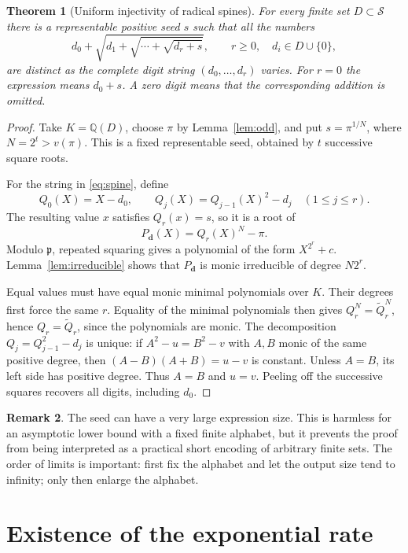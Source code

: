 \documentclass[11pt,letterpaper]{article}
\numberwithin{equation}{section}
\newtheorem{theorem}{Theorem}[section]
\theoremstyle{definition}
\newtheorem{remark}[theorem]{Remark}
\newcommand{\Sset}{\mathcal S}
\newcommand{\Q}{\mathbb Q}
\begin{document}
\begin{theorem}[Uniform injectivity of radical spines]\label{thm:spines}
For every finite set $D\subset\Sset$ there is a representable positive seed
$s$ such that all the numbers
\begin{equation}\label{eq:spine}
 d_0+\sqrt{d_1+\sqrt{\cdots+\sqrt{d_r+s}}},
 \qquad r\ge0,\quad d_i\in D\cup\{0\},
\end{equation}
are distinct as the complete digit string $(d_0,\ldots,d_r)$ varies.
For $r=0$ the expression means $d_0+s$. A zero digit means that the
corresponding addition is omitted.
\end{theorem}
\begin{proof}
Take $K=\Q(D)$, choose $\pi$ by Lemma~\ref{lem:odd}, and put
$s=\pi^{1/N}$, where $N=2^t>v(\pi)$. This is a fixed representable seed,
obtained by $t$ successive square roots.

For the string in \eqref{eq:spine}, define
\[
 Q_0(X)=X-d_0,\qquad Q_j(X)=Q_{j-1}(X)^2-d_j\quad(1\le j\le r).
\]
The resulting value $x$ satisfies $Q_r(x)=s$, so it is a root of
\[
 P_{\boldsymbol d}(X)=Q_r(X)^N-\pi.
\]
Modulo $\mathfrak p$, repeated squaring gives a polynomial of the form
$X^{2^r}+c$. Lemma~\ref{lem:irreducible} shows that $P_{\boldsymbol d}$ is
monic irreducible of degree $N2^r$.

Equal values must have equal monic minimal polynomials over $K$.
Their degrees first force the same $r$. Equality of the minimal polynomials
then gives $Q_r^N=\widetilde Q_r^N$, hence $Q_r=\widetilde Q_r$, since the
polynomials are monic.
The decomposition $Q_j=Q_{j-1}^2-d_j$ is unique: if
$A^2-u=B^2-v$ with $A,B$ monic of the same positive degree, then
$(A-B)(A+B)=u-v$ is constant. Unless $A=B$, its left side has positive degree.
Thus $A=B$ and $u=v$.
Peeling off the successive squares recovers all digits, including $d_0$.
\end{proof}

\begin{remark}
The seed can have a very large expression size. This is harmless for an
asymptotic lower bound with a fixed finite alphabet, but it prevents the proof
from being interpreted as a practical short encoding of arbitrary finite
sets. The order of limits is important: first fix the alphabet and let the
output size tend to infinity; only then enlarge the alphabet.
\end{remark}

\section{Existence of the exponential rate}
\end{document}
